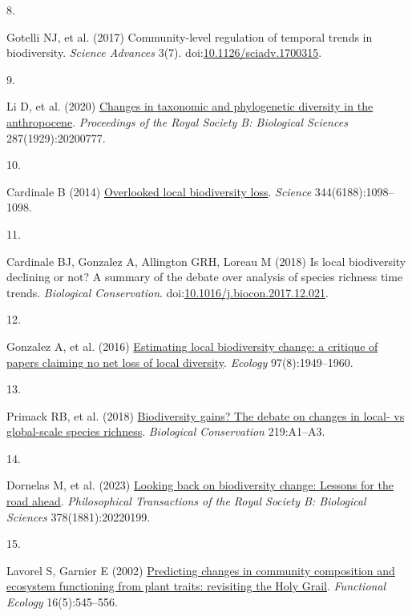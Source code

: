 \documentclass{article}
\newlength{\cslhangindent}
\newlength{\csllabelwidth}
\newlength{\cslentryspacingunit} %
\newenvironment{CSLReferences}[2] %
 {%
  \setlength{\parindent}{0pt}
  \ifodd #1
  \let\oldpar\par
  \def\par{\hangindent=\cslhangindent\oldpar}
  \fi
  \setlength{\parskip}{#2\cslentryspacingunit}
 }%
 {}
\newcommand{\CSLLeftMargin}[1]{\parbox[t]{\csllabelwidth}{#1}}
\newcommand{\CSLRightInline}[1]{\parbox[t]{\linewidth - \csllabelwidth}{#1}\break}
\begin{document}
\begin{CSLReferences}{0}{0}
\leavevmode{}%
\CSLLeftMargin{8. }%
\CSLRightInline{Gotelli NJ, et al. (2017) Community-level regulation of
temporal trends in biodiversity. \emph{Science Advances} 3(7).
doi:\href{https://doi.org/10.1126/sciadv.1700315}{10.1126/sciadv.1700315}.}

\leavevmode{}%
\CSLLeftMargin{9. }%
\CSLRightInline{Li D, et al. (2020)
\href{https://doi.org/10.1098/rspb.2020.0777}{Changes in taxonomic and
phylogenetic diversity in the anthropocene}. \emph{Proceedings of the
Royal Society B: Biological Sciences} 287(1929):20200777.}

\leavevmode{}%
\CSLLeftMargin{10. }%
\CSLRightInline{Cardinale B (2014)
\href{https://doi.org/10.1126/science.344.6188.1098-a}{Overlooked local
biodiversity loss}. \emph{Science} 344(6188):1098--1098.}

\leavevmode{}%
\CSLLeftMargin{11. }%
\CSLRightInline{Cardinale BJ, Gonzalez A, Allington GRH, Loreau M (2018)
Is local biodiversity declining or not? A summary of the debate over
analysis of species richness time trends. \emph{Biological
Conservation}.
doi:\href{https://doi.org/10.1016/j.biocon.2017.12.021}{10.1016/j.biocon.2017.12.021}.}

\leavevmode{}%
\CSLLeftMargin{12. }%
\CSLRightInline{Gonzalez A, et al. (2016)
\href{https://doi.org/10.1890/15-1759.1}{Estimating local biodiversity
change: a critique of papers claiming no net loss of local diversity}.
\emph{Ecology} 97(8):1949--1960.}

\leavevmode{}%
\CSLLeftMargin{13. }%
\CSLRightInline{Primack RB, et al. (2018)
\href{https://doi.org/10.1016/j.biocon.2017.12.023}{Biodiversity gains?
The debate on changes in local- vs global-scale species richness}.
\emph{Biological Conservation} 219:A1--A3.}

\leavevmode{}%
\CSLLeftMargin{14. }%
\CSLRightInline{Dornelas M, et al. (2023)
\href{https://doi.org/10.1098/rstb.2022.0199}{Looking back on
biodiversity change: Lessons for the road ahead}. \emph{Philosophical
Transactions of the Royal Society B: Biological Sciences}
378(1881):20220199.}

\leavevmode{}%
\CSLLeftMargin{15. }%
\CSLRightInline{Lavorel S, Garnier E (2002)
\href{https://doi.org/10.1046/j.1365-2435.2002.00664.x}{Predicting
changes in community composition and ecosystem functioning from plant
traits: revisiting the Holy Grail}. \emph{Functional Ecology}
16(5):545--556.}


\end{CSLReferences}
\end{document}
